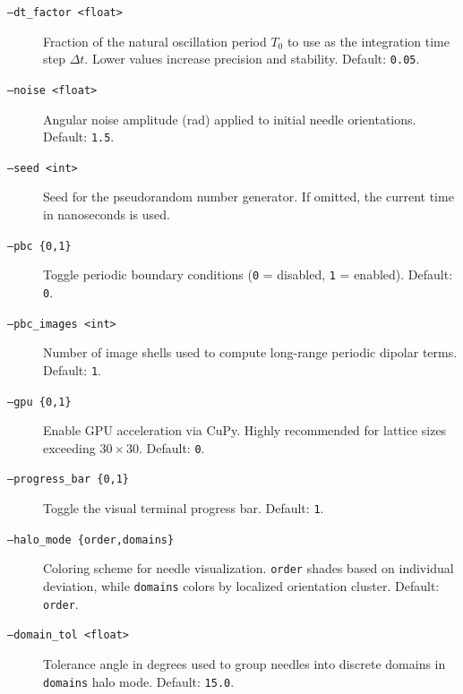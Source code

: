 \documentclass[11pt,a4paper]{article}
\newcommand{\code}[1]{\texttt{#1}}
\begin{document}
\begin{description}
    \item[\code{--dt\_factor <float>}] Fraction of the natural oscillation period $T_0$ to use as the integration time step $\Delta t$. Lower values increase precision and stability. Default: \code{0.05}.
    \item[\code{--noise <float>}] Angular noise amplitude (\si{rad}) applied to initial needle orientations. Default: \code{1.5}.
    \item[\code{--seed <int>}] Seed for the pseudorandom number generator. If omitted, the current time in nanoseconds is used.
    \item[\code{--pbc \{0,1\}}] Toggle periodic boundary conditions (\code{0} = disabled, \code{1} = enabled). Default: \code{0}.
    \item[\code{--pbc\_images <int>}] Number of image shells used to compute long-range periodic dipolar terms. Default: \code{1}.
    \item[\code{--gpu \{0,1\}}] Enable GPU acceleration via CuPy. Highly recommended for lattice sizes exceeding $30 \times 30$. Default: \code{0}.
    \item[\code{--progress\_bar \{0,1\}}] Toggle the visual terminal progress bar. Default: \code{1}.
    \item[\code{--halo\_mode \{order,domains\}}] Coloring scheme for needle visualization. \code{order} shades based on individual deviation, while \code{domains} colors by localized orientation cluster. Default: \code{order}.
    \item[\code{--domain\_tol <float>}] Tolerance angle in degrees used to group needles into discrete domains in \code{domains} halo mode. Default: \code{15.0}.
\end{description}
\end{document}
